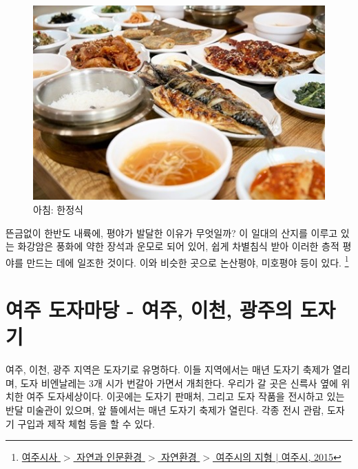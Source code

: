 \begin{figure}[ht]
    \centering
    \includegraphics[width=.6\textwidth]{img/한정식.jpg}
    \caption{아침: 한정식 \protect\footnotemark}
    \label{fig:my_labe2}
\end{figure}
뜬금없이 한반도 내륙에, 평야가 발달한 이유가 무엇일까?
이 일대의 산지를 이루고 있는 화강암은 풍화에 약한 장석과 운모로 되어 있어, 
쉽게 차별침식 받아 이러한 층적 평야를 만드는 데에 일조한 것이다.
이와 비슷한 곳으로 논산평야, 미호평야 등이 있다.
\footnote{ \href{https://www.yeoju.go.kr/history/main.jsp}{여주시사 $>$ 자연과 인문환경 $>$ 자연환경 $>$ 여주시의 지형 $|$ 여주시, 2015}}

\section{여주 도자마당 - 여주, 이천, 광주의 도자기}
여주, 이천, 광주 지역은 도자기로 유명하다. 이들 지역에서는 매년 도자기 축제가 열리며, 도자 비엔날레는 3개 시가 번갈아 가면서 개최한다.
우리가 갈 곳은 신륵사 옆에 위치한 여주 도자세상이다.
 이곳에는 도자기 판매처, 그리고 도자 작품을 전시하고 있는 반달 미술관이 있으며, 앞 뜰에서는 매년 도자기 축제가 열린다. 
 각종 전시 관람, 도자기 구입과 제작 체험 등을 할 수 있다.


